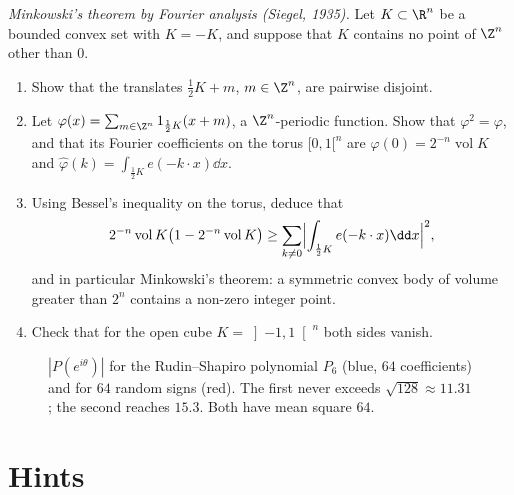 \begin{exercise}[$\star\star\star$]\label{pb:siegel}
\emph{Minkowski's theorem by Fourier analysis (Siegel, 1935).} Let $K\subset\R^n$ be a bounded convex set with $K=-K$, and suppose
that $K$ contains no point of $\Z^n$ other than $0$.
\begin{enumerate}[label=(\alph*)]
\item Show that the translates $\frac12K+m$, $m\in\Z^n$, are pairwise disjoint.
\item Let $\varphi(x)=\sum_{m\in\Z^n}1_{\frac12K}(x+m)$, a $\Z^n$-periodic function. Show that $\varphi^2=\varphi$, and that its Fourier coefficients
on the torus $[0,1[^n$ are $\hat\varphi(0)=2^{-n}\operatorname{vol}K$ and $\hat\varphi(k)=\int_{\frac12K}e(-k\cdot x)\dd x$.
\item Using Bessel's inequality on the torus, deduce that
\[
2^{-n}\operatorname{vol}K\bigl(1-2^{-n}\operatorname{vol}K\bigr)\ge\sum_{k\ne0}\Bigl|\int_{\frac12K}e(-k\cdot x)\dd x\Bigr|^2,
\]
and in particular Minkowski's theorem: a symmetric convex body of volume greater than $2^n$ contains a non-zero integer point.
\item Check that for the open cube $K=\left]-1,1\right[^n$ both sides vanish.
\end{enumerate}
\end{exercise}

\begin{figure}[ht]
\centering
{}
\caption{$|P(e^{i\theta})|$ for the Rudin--Shapiro polynomial $P_6$ (blue, $64$ coefficients) and for $64$ random signs (red).
The first never exceeds $\sqrt{128}\approx11.31$; the second reaches $15.3$. Both have mean square $64$.}
\label{fig:rudin}
\end{figure}

\section{Hints}

